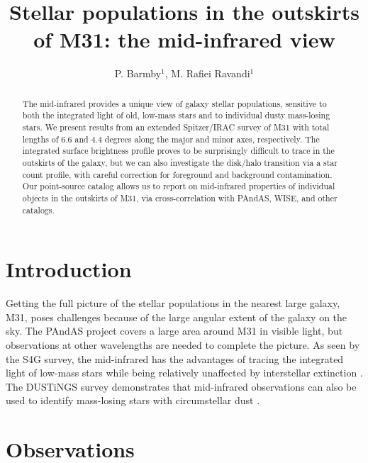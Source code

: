 \documentclass{iau}
\title[S321.~~Mid-infrared outskirts of M31] %
{Stellar populations in the outskirts of M31: the mid-infrared view}
\author[P. Barmby \& M. Rafiei Ravandi]   %
{P. Barmby$^1$, M. Rafiei Ravandi$^1$}
\affiliation{$^1$Department of Physics and Astronomy and Centre for Planetary and Space Exploration,
University of Western Ontario, London, Canada \\ email: {\tt pbarmby@uwo.ca}}
\begin{document}
\maketitle

\begin{abstract}
The mid-infrared provides a unique view of galaxy stellar populations, sensitive to both the integrated light of old, 
low-mass stars and to individual dusty mass-losing stars. We present results from an extended Spitzer/IRAC survey 
of M31 with total lengths of 6.6 and 4.4 degrees along the major and minor axes, respectively. The integrated surface 
brightness profile proves to be surprisingly difficult to trace in the outskirts of the galaxy, but we can also investigate 
the disk/halo transition via a star count profile, with careful correction for foreground and background contamination. 
Our point-source catalog allows us to report on mid-infrared properties of individual objects in the outskirts of M31, 
via cross-correlation with PAndAS, WISE, and other catalogs.

\end{abstract}

\firstsection %
\section{Introduction}

Getting the full picture of the stellar populations in the nearest large galaxy, M31, poses challenges because of the
large angular extent of the galaxy on the sky. The PAndAS project \cite[(McConnachie \etal\ 2009)]{pandas} covers
a large area around M31 in visible light, but observations at other wavelengths are needed to complete the picture.
As seen by the S4G survey, the mid-infrared has the advantages of tracing the integrated light of low-mass stars while being relatively unaffected 
by interstellar extinction \cite[(Querejeta \etal\ 2015)]{q15}. The DUSTiNGS survey demonstrates that mid-infrared observations can 
also be used to identify  mass-losing stars with circumstellar dust \cite[(Boyer \etal\ 2015)]{boyer15}.

\section{Observations}
\end{document}
